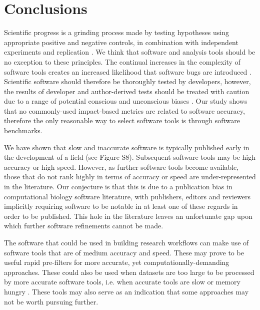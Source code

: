 \documentclass[fleqn,10pt]{SelfArx} %
\begin{document}
\section*{Conclusions}
Scientific progress is a grinding process made by testing hypotheses using appropriate positive and negative controls, in combination with independent experiments and replication \cite{Ioannidis2005-xh,Moonesinghe2007-kk}. We think that software and analysis tools should be no exception to these principles. The continual increases in the complexity of software tools creates an increased likelihood that software bugs are introduced \cite{Darriba2015-sz}. Scientific software should therefore be thoroughly tested by developers, however, the results of developer and author-derived tests should be treated with caution due to a range of potential conscious and unconscious biases \cite{Norel2011-cq}. Our study shows that no commonly-used impact-based metrics are related to software accuracy, therefore the only reasonable way to select software tools is through software benchmarks.

We have shown that slow and inaccurate software is typically published early in the development of a field (see Figure S8). Subsequent software tools may be high accuracy or high speed. However, as further software tools become available, those that do not rank highly in terms of accuracy or speed are under-represented in the literature. Our conjecture is that this is due to a publication bias in computational biology software literature, with publishers, editors and reviewers implicitly requiring software to be notable in at least one of these regards in order to be published. This hole in the literature leaves an unfortunate gap upon which further software refinements cannot be made. 

The software that could be used in building research workflows can make use of software tools that are of medium accuracy and speed. These may prove to be useful rapid pre-filters for more accurate, yet computationally-demanding approaches. These could also be used when datasets are too large to be processed by more accurate software tools, i.e. when accurate tools are slow or memory hungry \cite{Lowe1997-hq,Weinberg2006-tm}. These tools may also serve as an indication that some approaches may not be worth pursuing further.
\end{document}
